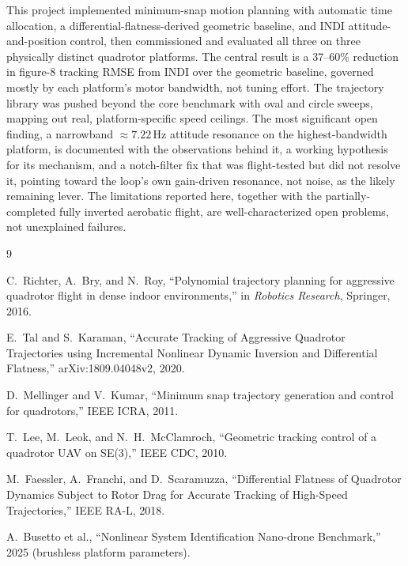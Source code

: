 \documentclass[11pt,a4paper]{article}
\begin{document}
This project implemented minimum-snap motion planning with automatic time allocation, a
differential-flatness-derived geometric baseline, and INDI attitude-and-position control, then
commissioned and evaluated all three on three physically distinct quadrotor platforms. The
central result is a 37--60\% reduction in figure-8 tracking RMSE from INDI over the geometric
baseline, governed mostly by each platform's motor bandwidth, not tuning effort. The trajectory
library was pushed beyond the core benchmark with oval and circle sweeps, mapping out real,
platform-specific speed ceilings. The most significant open finding, a narrowband
$\approx7.22$\,Hz attitude resonance on the highest-bandwidth platform, is documented with the
observations behind it, a working hypothesis for its mechanism, and a notch-filter fix that was
flight-tested but did not resolve it, pointing toward the loop's own gain-driven resonance, not
noise, as the likely remaining lever. The limitations reported here, together with the
partially-completed fully inverted aerobatic flight, are well-characterized open problems, not
unexplained failures.

\begin{thebibliography}{9}

C.~Richter, A.~Bry, and N.~Roy, ``Polynomial trajectory planning for aggressive quadrotor
flight in dense indoor environments,'' in \textit{Robotics Research}, Springer, 2016.

E.~Tal and S.~Karaman, ``Accurate Tracking of Aggressive Quadrotor Trajectories using
Incremental Nonlinear Dynamic Inversion and Differential Flatness,'' arXiv:1809.04048v2, 2020.

D.~Mellinger and V.~Kumar, ``Minimum snap trajectory generation and control for quadrotors,''
IEEE ICRA, 2011.

T.~Lee, M.~Leok, and N.~H.~McClamroch, ``Geometric tracking control of a quadrotor UAV on
SE(3),'' IEEE CDC, 2010.

M.~Faessler, A.~Franchi, and D.~Scaramuzza, ``Differential Flatness of Quadrotor Dynamics
Subject to Rotor Drag for Accurate Tracking of High-Speed Trajectories,'' IEEE RA-L, 2018.

A.~Busetto et al., ``Nonlinear System Identification Nano-drone Benchmark,'' 2025 (brushless
platform parameters).

\end{thebibliography}
\end{document}
